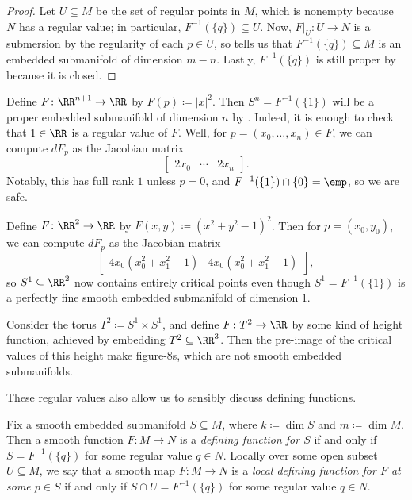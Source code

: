\documentclass[../notes.tex]{subfiles}
\begin{document}
\begin{proof}
	Let $U\subseteq M$ be the set of regular points in $M$, which is nonempty because $N$ has a regular value; in particular, $F^{-1}(\{q\})\subseteq U$. Now, $F|_U\colon U\to N$ is a submersion by the regularity of each $p\in U$, so  tells us that $F^{-1}(\{q\})\subseteq M$ is an embedded submanifold of dimension $m-n$. Lastly, $F^{-1}(\{q\})$ is still proper by  because it is closed.
\end{proof}
\begin{example}
	Define $F\colon\RR^{n+1}\to\RR$ by $F(p)\coloneqq\left|x\right|^2$. Then $S^n=F^{-1}(\{1\})$ will be a proper embedded submanifold of dimension $n$ by . Indeed, it is enough to check that $1\in\RR$ is a regular value of $F$. Well, for $p=(x_0,\ldots,x_n)\in F$, we can compute $dF_p$ as the Jacobian matrix
	\[\begin{bmatrix}
		2x_0 & \cdots & 2x_n
	\end{bmatrix}.\]
	Notably, this has full rank $1$ unless $p=0$, and $F^{-1}(\{1\})\cap\{0\}=\emp$, so we are safe.
\end{example}
\begin{example}
	Define $F\colon\RR^2\to\RR$ by $F(x,y)\coloneqq\left(x^2+y^2-1\right)^2$. Then for $p=(x_0,y_0)$, we can compute $dF_p$ as the Jacobian matrix
	\[\begin{bmatrix}
		4x_0\left(x_0^2+x_1^2-1\right) & 4x_0\left(x_0^2+x_1^2-1\right)
	\end{bmatrix},\]
	so $S^1\subseteq\RR^2$ now contains entirely critical points even though $S^1=F^{-1}(\{1\})$ is a perfectly fine smooth embedded submanifold of dimension $1$.
\end{example}
\begin{example}
	Consider the torus $T^2\coloneqq S^1\times S^1$, and define $F\colon T^2\to\RR$ by some kind of height function, achieved by embedding $T^2\subseteq\RR^3$. Then the pre-image of the critical values of this height make figure-$8$s, which are not smooth embedded submanifolds.
\end{example}
These regular values also allow us to sensibly discuss defining functions.
\begin{definition}
	Fix a smooth embedded submanifold $S\subseteq M$, where $k\coloneqq\dim S$ and $m\coloneqq\dim M$. Then a smooth function $F\colon M\to N$ is a \textit{defining function for $S$} if and only if $S=F^{-1}(\{q\})$ for some regular value $q\in N$. Locally over some open subset $U\subseteq M$, we say that a smooth map $F\colon M\to N$ is a \textit{local defining function for $F$ at some $p\in S$} if and only if $S\cap U=F^{-1}(\{q\})$ for some regular value $q\in N$.
\end{definition}
\end{document}
